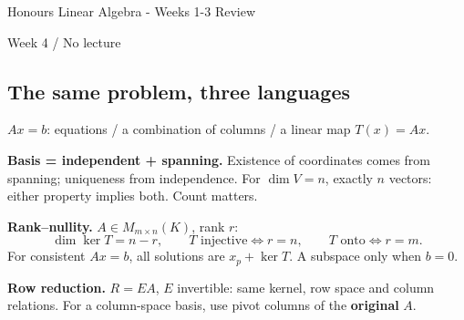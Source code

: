 \documentclass[11pt,letterpaper]{article}
\begin{document}
\begin{center}
{\LARGE Honours Linear Algebra - Weeks 1-3 Review\par}
\vspace{5pt}
{\large Week 4 / No lecture\par}
\end{center}
\vspace{4pt}
\subsection{The same problem, three
languages}\label{the-same-problem-three-languages}

\(Ax=b\): equations / a combination of columns / a linear map
\(T(x)=Ax\).

\textbf{Basis = independent + spanning.} Existence of coordinates comes
from spanning; uniqueness from independence. For \(\dim V=n\), exactly
\(n\) vectors: either property implies both. Count matters.

\textbf{Rank--nullity.} \(A\in M_{m\times n}(K)\), rank \(r\): \[
\dim\ker T=n-r,\qquad
T\text{ injective}\iff r=n,\qquad T\text{ onto}\iff r=m.
\] For consistent \(Ax=b\), all solutions are \(x_p+\ker T\). A subspace
only when \(b=0\).

\textbf{Row reduction.} \(R=EA\), \(E\) invertible: same kernel, row
space and column relations. For a column-space basis, use pivot columns
of the \textbf{original} \(A\).

\end{document}
